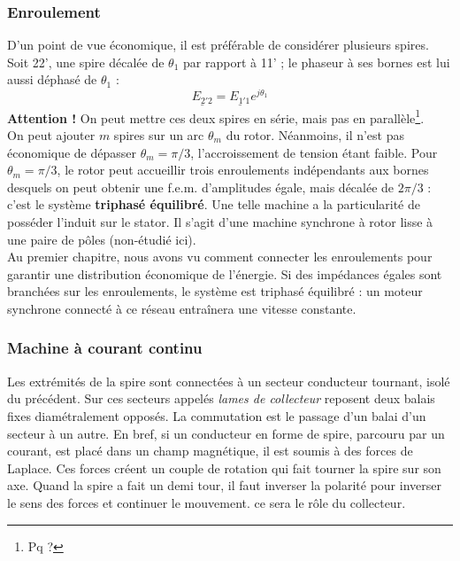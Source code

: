		\subsubsection{Enroulement}
		D'un point de vue économique, il est préférable de considérer 
		plusieurs spires. Soit 22', une spire décalée de $\theta_1$ 
		par rapport à 11' ; le phaseur à ses bornes est lui aussi 
		déphasé de $\theta_1$ :
		\begin{equation}
		\underline{E_{2'2}} = \underline{E_{1'1}}e^{j\theta_1}
		\end{equation}
		\textbf{Attention !} On peut mettre ces deux spires en série, 
		mais pas en parallèle\footnote{Pq ?}.\\
		
		On peut ajouter $m$ spires sur un arc $\theta_m$ du rotor. 
		Néanmoins, 	il n'est pas économique de dépasser $\theta_m = 
		\pi/3$, l'accroissement de tension étant faible. Pour $\theta_m = 
		\pi/3$, le rotor peut accueillir trois enroulements indépendants 
		aux bornes desquels on peut obtenir une f.e.m. d'amplitudes 
		égale, mais décalée de $2\pi/3$ : c'est le système \textbf{triphasé 
		équilibré}. Une telle machine a la particularité de posséder l'induit sur 
		le stator. Il s'agit d'une machine synchrone à rotor lisse à 
		une paire de pôles (non-étudié ici).\\
		
		Au premier chapitre, nous avons vu comment connecter les enroulements 
		pour garantir une distribution économique de l'énergie. Si des 
		impédances égales sont branchées sur les enroulements, le système 
		est triphasé équilibré : un moteur synchrone connecté à ce réseau 
		entraînera une vitesse constante.
		
		
		\subsubsection{Machine à courant continu}
		Les extrémités de la spire sont connectées à un secteur conducteur 
		tournant, isolé du précédent. Sur ces secteurs appelés \textit{lames 
		de collecteur} reposent deux balais fixes diamétralement opposés. La 
		commutation est le passage d'un balai d'un secteur à un autre. En bref, 
		si un conducteur en forme de spire, parcouru par un courant, est placé
		dans un champ magnétique, il est soumis à des forces de Laplace. Ces forces 
		créent un couple de rotation qui fait tourner la spire sur son axe. Quand 
		la spire a fait un demi tour, il faut inverser la polarité pour inverser le 
		sens des forces et continuer le mouvement. ce sera le rôle du collecteur.
		
